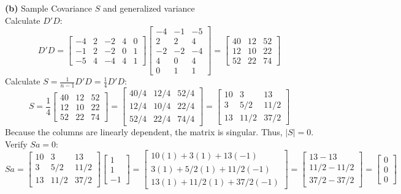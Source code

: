 \documentclass{article}
\begin{document}
\noindent \textbf{(b)} Sample Covariance $S$ and generalized variance \\
Calculate $D'D$:
\[
D'D = \begin{bmatrix} -4 & 2 & -2 & 4 & 0 \\ -1 & 2 & -2 & 0 & 1 \\ -5 & 4 & -4 & 4 & 1 \end{bmatrix} \begin{bmatrix} -4 & -1 & -5 \\ 2 & 2 & 4 \\ -2 & -2 & -4 \\ 4 & 0 & 4 \\ 0 & 1 & 1 \end{bmatrix} = \begin{bmatrix} 40 & 12 & 52 \\ 12 & 10 & 22 \\ 52 & 22 & 74 \end{bmatrix}
\]
Calculate $S = \frac{1}{n-1}D'D = \frac{1}{4}D'D$:
\[
S = \frac{1}{4} \begin{bmatrix} 40 & 12 & 52 \\ 12 & 10 & 22 \\ 52 & 22 & 74 \end{bmatrix} = \begin{bmatrix} 40/4 & 12/4 & 52/4 \\ 12/4 & 10/4 & 22/4 \\ 52/4 & 22/4 & 74/4 \end{bmatrix} = \begin{bmatrix} 10 & 3 & 13 \\ 3 & 5/2 & 11/2 \\ 13 & 11/2 & 37/2 \end{bmatrix}
\]
Because the columns are linearly dependent, the matrix is singular. Thus, $|S| = 0$.
Verify $Sa = 0$:
\[
Sa = \begin{bmatrix} 10 & 3 & 13 \\ 3 & 5/2 & 11/2 \\ 13 & 11/2 & 37/2 \end{bmatrix} \begin{bmatrix} 1 \\ 1 \\ -1 \end{bmatrix} = \begin{bmatrix} 10(1) + 3(1) + 13(-1) \\ 3(1) + 5/2(1) + 11/2(-1) \\ 13(1) + 11/2(1) + 37/2(-1) \end{bmatrix} = \begin{bmatrix} 13-13 \\ 11/2-11/2 \\ 37/2-37/2 \end{bmatrix} = \begin{bmatrix} 0 \\ 0 \\ 0 \end{bmatrix}
\]
\end{document}
